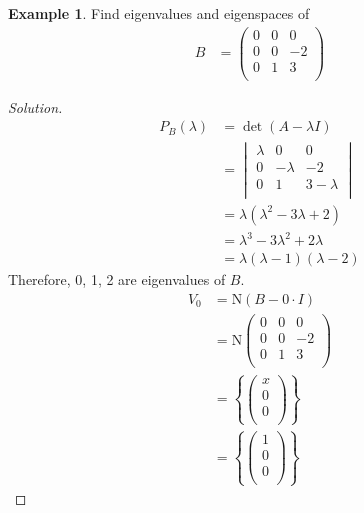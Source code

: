 \documentclass[fleqn, a4paper, 12pt]{article}
\newcommand{\N}{\mathrm{N}}
\theoremstyle{definition}
\newtheorem{example}{Example}
\theoremstyle{theorem}
\newenvironment{solution}
{\begin{proof}[Solution]\let\qed\relax}
	{\end{proof}}
\begin{document}
\begin{example}
	Find eigenvalues and eigenspaces of 
	\begin{align*}
		B &=
			\begin{pmatrix}
				0 & 0 & 0\\
				0 & 0 & -2\\
				0 & 1 & 3\\
			\end{pmatrix}
	\end{align*}
\end{example}

\begin{solution}
	\begin{align*}
		P_B (\lambda) &= \det (A - \lambda I)\\
		&= 
			\begin{vmatrix}
				\lambda & 0 & 0\\
				0 & -\lambda & -2\\
				0 & 1 & 3 - \lambda\\
			\end{vmatrix}\\
		&= \lambda(\lambda^2 - 3 \lambda + 2)\\
		&= \lambda^3 - 3 \lambda^2 + 2\lambda\\
		&= \lambda (\lambda - 1) (\lambda - 2)
	\end{align*}
	Therefore, 0, 1, 2 are eigenvalues of $B$.
	\begin{align*}
		V_0 &= \N (B - 0 \cdot I)\\
		&= \N 
			\begin{pmatrix}
				0 & 0 & 0\\
				0 & 0 & -2\\
				0 & 1 & 3\\
			\end{pmatrix}\\
		&= 
			\left\lbrace
				\begin{pmatrix}
					x\\
					0\\
					0\\
				\end{pmatrix}
			\right\rbrace\\
		&= 
			\left\lbrace
				\begin{pmatrix}
					1\\
					0\\
					0\\
				\end{pmatrix}
			\right\rbrace
	\end{align*}

\end{solution}
\end{document}
